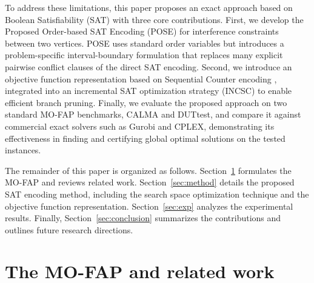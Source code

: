\documentclass[letterpaper,journal]{IEEEtran}
\begin{document}
To address these limitations, this paper proposes an exact approach based on Boolean Satisfiability (SAT) with three core contributions. 
First, we develop the Proposed Order-based SAT Encoding (POSE) for interference constraints between two vertices. POSE uses standard order variables but introduces a problem-specific interval-boundary formulation that replaces many explicit pairwise conflict clauses of the direct SAT encoding.
Second, we introduce an objective function representation based on Sequential Counter encoding \cite{Sinz2005}, integrated into an incremental SAT optimization strategy (INCSC) to enable efficient branch pruning. Finally, we evaluate the proposed approach on two standard MO-FAP benchmarks, CALMA and DUTtest, and compare it against commercial exact solvers such as Gurobi and CPLEX, demonstrating its effectiveness in finding and certifying global optimal solutions on the tested instances.

The remainder of this paper is organized as follows. Section~\ref{sec:Problem_statement} formulates the MO-FAP and reviews related work. Section~\ref{sec:method} details the proposed SAT encoding method, including the search space optimization technique and the objective function representation. Section~\ref{sec:exp} analyzes the experimental results. Finally, Section~\ref{sec:conclusion} summarizes the contributions and outlines future research directions.

\section{The MO-FAP and related work}
\label{sec:Problem_statement}
\end{document}
